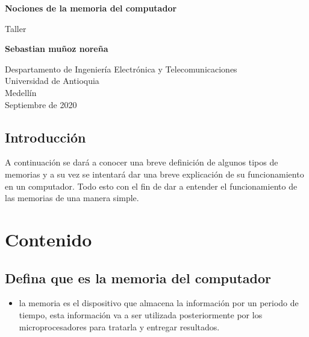\documentclass{article}
\begin{document}
\begin{titlepage}
    \begin{center}
        \vspace*{1cm}
            
        \Huge
        \textbf{Nociones de la memoria del computador}
            
        \vspace{0.5cm}
        \LARGE
        Taller
            
        \vspace{1.5cm}
            
        \textbf{Sebastian muñoz noreña}
            
        \vfill
            
        \vspace{0.8cm}
            
        \Large
        Despartamento de Ingeniería Electrónica y Telecomunicaciones\\
        Universidad de Antioquia\\
        Medellín\\
        Septiembre de 2020
            
    \end{center}
\end{titlepage}

\tableofcontents
\pagebreak
\begin{center}
    

\section{Introducción}\end{center}
A continuación se dará a conocer una breve definición de algunos tipos de memorias y a su vez se intentará dar una breve explicación de su funcionamiento en un computador. Todo esto con el fin de dar a entender el funcionamiento de las memorias de una manera simple.

\pagebreak


\section{Contenido} 
    \subsection{Defina que es la memoria del computador}
         \begin{itemize} \item{}
        la memoria es el dispositivo que almacena la información por un periodo de tiempo, esta información va a ser utilizada posteriormente por los microprocesadores para tratarla y entregar resultados.\cite{Referencia}
        \end{itemize} 
\end{document}
